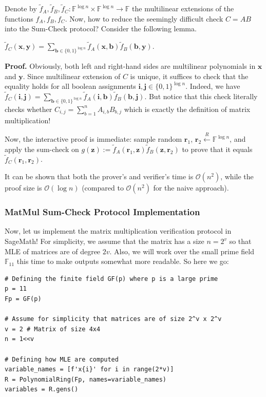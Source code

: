 \documentclass{gkr-template}
\begin{document}
Denote by $\widetilde{f}_A, \widetilde{f}_B, \widetilde{f}_C: \mathbb{F}^{\log n} \times \mathbb{F}^{\log n} \to \mathbb{F}$ the
multilinear extensions of the functions $f_A, f_B, f_C$. Now, how to 
reduce the seemingly difficult check $C = AB$ into the Sum-Check
protocol? Consider the following lemma.
\begin{lemma}
    $\widetilde{f}_C(\mathbf{x},\mathbf{y}) = \sum_{\boldsymbol{b} \in \{0,1\}^{\log n}} \widetilde{f}_A(\mathbf{x}, \boldsymbol{b})\widetilde{f}_B(\boldsymbol{b}, \mathbf{y})$.
\end{lemma}

\textbf{Proof.} Obviously, both left and right-hand sides are multilinear
polynomials in $\mathbf{x}$ and $\mathbf{y}$. Since multilinear extension of $C$
is unique, it suffices to check that the equality holds for all boolean
assignments $\boldsymbol{i}, \boldsymbol{j} \in \{0,1\}^{\log n}$. Indeed, we
have $\widetilde{f}_C(\boldsymbol{i},\boldsymbol{j}) = \sum_{\boldsymbol{b} \in
\{0,1\}^{\log n}} \widetilde{f}_A(\boldsymbol{i},
\boldsymbol{b})\widetilde{f}_B(\boldsymbol{b}, \boldsymbol{j})$. But notice that
this check literally checks whether $C_{i,j} = \sum_{b=1}^n A_{i,b}B_{b,j}$
which is exactly the definition of matrix multiplication!

Now, the interactive proof is immediate: sample random $\boldsymbol{r}_1$,
$\boldsymbol{r}_2 \xleftarrow{R} \mathbb{F}^{\log n}$, and apply the sum-check
on $g(\mathbf{z}) := \widetilde{f}_A(\boldsymbol{r}_1,
\mathbf{z})\widetilde{f}_B(\mathbf{z}, \boldsymbol{r}_2)$ to prove that it 
equals $\widetilde{f}_C(\boldsymbol{r}_1, \boldsymbol{r}_2)$.

It can be shown that both the prover's and verifier's time is
$\mathcal{O}(n^2)$, while the proof size is $\mathcal{O}(\log n)$ (compared to
$\mathcal{O}(n^2)$ for the naive approach).

\subsubsection{MatMul Sum-Check Protocol Implementation}

Now, let us implement the matrix multiplication verification protocol in
SageMath! For simplicity, we assume that the matrix has a size $n=2^v$ so that
MLE of matrices are of degree $2v$. Also, we will work over the small prime
field $\mathbb{F}_{11}$ this time to make outputs somewhat more readable. 
So here we go:
\begin{verbatim}
# Defining the finite field GF(p) where p is a large prime
p = 11
Fp = GF(p)

# Assume for simplicity that matrices are of size 2^v x 2^v
v = 2 # Matrix of size 4x4
n = 1<<v

# Defining how MLE are computed
variable_names = [f'x{i}' for i in range(2*v)]
R = PolynomialRing(Fp, names=variable_names)
variables = R.gens()
\end{verbatim}
\end{document}

